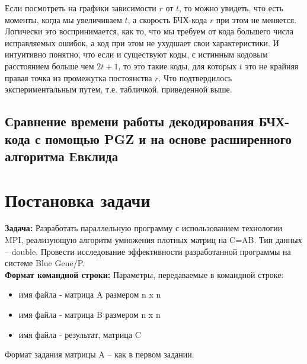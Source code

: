 \documentclass[12pt]{article}
\begin{document}
            Если посмотреть на графики зависимости $r$ от $t$, то можно увидеть, что есть моменты, когда мы увеличиваем $t$, а скорость БЧХ-кода $r$ при этом не меняется. Логически это воспринимается, как то, что мы требуем от кода большего числа исправляемых ошибок, а код при этом не ухудшает свои характеристики. И интуитивно понятно, что если и существуют коды, с истинным кодовым расстоянием больше чем $2t + 1$, то это такие коды, для которых $t$ это не крайняя правая точка из промежутка постоянства $r$. Что подтвердилось экспериментальным путем, т.е. табличкой, приведенной выше.

        \subsection{Сравнение времени работы декодирования БЧХ-кода с помощью PGZ и на основе расширенного алгоритма Евклида}





            
        
    \section{Постановка задачи}
        \textbf{Задача:} Разработать параллельную программу с использованием технологии MPI, реализующую
        алгоритм умножения плотных матриц на C=AB. Тип данных – double. Провести
        исследование эффективности разработанной программы на системе Blue Gene/P. \\

        \textbf{Формат командной строки:} Параметры, передаваемые в командной строке:
        \begin{itemize}
            \setlength{\itemsep}{1pt}
            \setlength{\parskip}{0pt}
            \setlength{\parsep}{0pt}
            \item имя файла - матрица A размером n x n
            \item имя файла - матрица B размером n x n
            \item имя файла - результат, матрица C
        \end{itemize}
        Формат задания матрицы A – как в первом задании. \\
\end{document}
